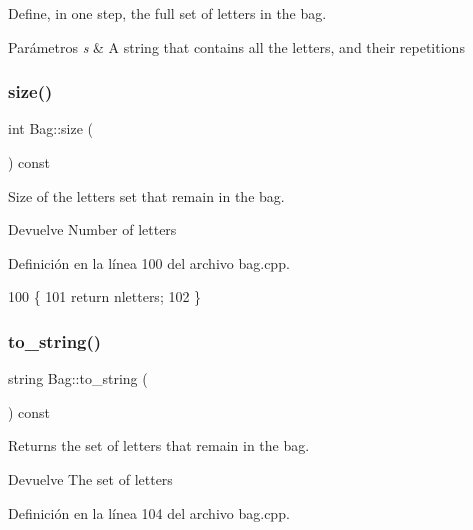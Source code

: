 Define, in one step, the full set of letters in the bag. 


\begin{DoxyParams}{Parámetros}
{\em s} & A string that contains all the letters, and their repetitions \\
\hline
\end{DoxyParams}
\mbox{\label{classBag_a32652be363a0f5d189b029ed863e5bf2}} 
\subsubsection{\texorpdfstring{size()}{size()}}
{\footnotesize\ttfamily int Bag\+::size (\begin{DoxyParamCaption}{ }\end{DoxyParamCaption}) const}



Size of the letters set that remain in the bag. 

\begin{DoxyReturn}{Devuelve}
Number of letters 
\end{DoxyReturn}


Definición en la línea 100 del archivo bag.\+cpp.


\begin{DoxyCode}
100                    \{
101     \textcolor{keywordflow}{return} nletters;
102 \}
\end{DoxyCode}
\mbox{\label{classBag_ac63bdc8c3ceed6d86db66b9d399764ab}} 
\subsubsection{\texorpdfstring{to\+\_\+string()}{to\_string()}}
{\footnotesize\ttfamily string Bag\+::to\+\_\+string (\begin{DoxyParamCaption}{ }\end{DoxyParamCaption}) const}



Returns the set of letters that remain in the bag. 

\begin{DoxyReturn}{Devuelve}
The set of letters 
\end{DoxyReturn}


Definición en la línea 104 del archivo bag.\+cpp.


